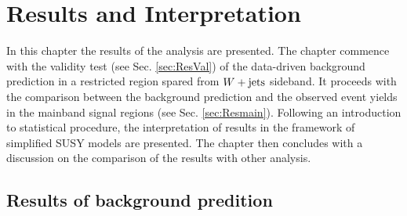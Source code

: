 \chapter{Results and Interpretation}
\minitoc
In this chapter the results of the analysis are presented. The chapter commence with the validity test (see Sec. \ref{sec:ResVal}) of the data-driven background prediction in a restricted region spared from $W+\textrm{jets}$ sideband. It proceeds with the comparison between the background prediction and the observed event yields in the mainband signal regions (see Sec. \ref{sec:Resmain}). Following an introduction to statistical procedure, the interpretation of results in the framework of simplified SUSY models are presented.  The chapter then concludes with a discussion on the comparison of the results with other analysis.
\section{Results of background predition}
